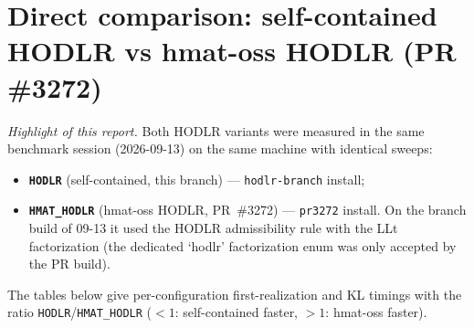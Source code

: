 \documentclass[11pt,a4paper]{article}
\begin{document}
\section{Direct comparison: self-contained HODLR vs hmat-oss HODLR (PR \#3272)}\label{sec:comparison}
\emph{Highlight of this report.} Both HODLR variants were measured in the same
benchmark session (2026-09-13) on the same machine with identical sweeps:
\begin{itemize}
\item \textbf{\texttt{HODLR}} (self-contained, this branch) --- \texttt{hodlr-branch} install;
\item \textbf{\texttt{HMAT\_HODLR}} (hmat-oss HODLR, PR~\#3272) --- \texttt{pr3272} install.
  On the branch build of 09-13 it used the HODLR admissibility rule with the
  LLt factorization (the dedicated `hodlr' factorization enum was only accepted
  by the PR build).
\end{itemize}
The tables below give per-configuration first-realization and KL timings with
the ratio \texttt{HODLR}/\texttt{HMAT\_HODLR} ($<1$: self-contained faster,
$>1$: hmat-oss faster).
\end{document}
